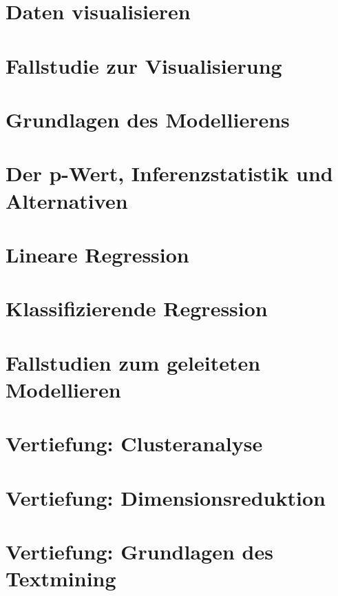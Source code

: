 \documentclass[12pt,ngerman,]{book}
\theoremstyle{definition}
\theoremstyle{definition}
\theoremstyle{remark}
\begin{document}
\chapter{Daten visualisieren}\label{daten-visualisieren}

\chapter{Fallstudie zur
Visualisierung}\label{fallstudie-zur-visualisierung}

\chapter{Grundlagen des Modellierens}\label{mod1}

\chapter{Der p-Wert, Inferenzstatistik und
Alternativen}\label{der-p-wert-inferenzstatistik-und-alternativen}

\chapter{Lineare Regression}\label{lineare-regression}

\chapter{Klassifizierende Regression}\label{klassifizierende-regression}

\chapter{Fallstudien zum geleiteten
Modellieren}\label{fallstudien-zum-geleiteten-modellieren}

\chapter{Vertiefung: Clusteranalyse}\label{cluster}

\chapter{Vertiefung:
Dimensionsreduktion}\label{vertiefung-dimensionsreduktion}

\chapter{Vertiefung: Grundlagen des
Textmining}\label{vertiefung-grundlagen-des-textmining}
\end{document}
